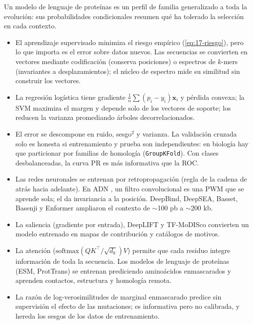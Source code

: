 \begin{ideaclave}
Un modelo de lenguaje de proteínas es un perfil de familia generalizado a toda la evolución: sus probabilidades condicionales resumen qué ha tolerado la selección en cada contexto.
\end{ideaclave}

\begin{resumen}
\begin{itemize}
  \item El aprendizaje supervisado minimiza el riesgo empírico (\cref{eq:17-riesgo}), pero lo que importa es el error sobre datos nuevos. Las secuencias se convierten en vectores mediante codificación  (conserva posiciones) o espectros de $k$-mers (invariantes a desplazamientos); el núcleo de espectro mide su similitud sin construir los vectores.
  \item La regresión logística tiene gradiente $\frac1n\sum(p_i-y_i)\mathbf{x}_i$ y pérdida convexa; la SVM maximiza el margen y depende solo de los vectores de soporte; los  reducen la varianza promediando árboles decorrelacionados.
  \item El error se descompone en ruido, sesgo$^2$ y varianza. La validación cruzada solo es honesta si entrenamiento y prueba son independientes: en biología hay que particionar por familias de homología (\texttt{GroupKFold}). Con clases desbalanceadas, la curva PR es más informativa que la ROC.
  \item Las redes neuronales se entrenan por retropropagación (regla de la cadena de atrás hacia adelante). En ADN , un filtro convolucional es una PWM que se aprende sola; el  da invariancia a la posición. DeepBind, DeepSEA, Basset, Basenji y Enformer ampliaron el contexto de $\sim$100 pb a $\sim$200 kb.
  \item La saliencia (gradiente por entrada), DeepLIFT y TF-MoDISco convierten un modelo entrenado en mapas de contribución y catálogos de motivos.
  \item La atención ($\mathrm{softmax}(QK^\top/\sqrt{d_k})V$) permite que cada residuo integre información de toda la secuencia. Los modelos de lenguaje de proteínas (ESM, ProtTrans) se entrenan prediciendo aminoácidos enmascarados y aprenden contactos, estructura y homología remota.
  \item La razón de log-verosimilitudes de marginal enmascarado predice sin supervisión el efecto de las mutaciones; es informativa pero no calibrada, y hereda los sesgos de los datos de entrenamiento.
\end{itemize}
\end{resumen}

